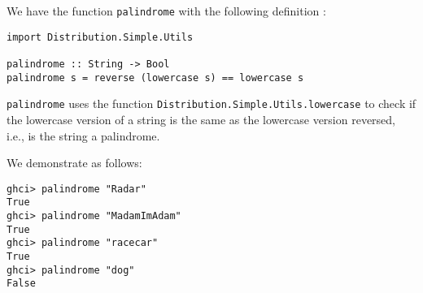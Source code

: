 
We have the function \verb|palindrome| with the following 
definition : 
\begin{verbatim}
import Distribution.Simple.Utils

palindrome :: String -> Bool
palindrome s = reverse (lowercase s) == lowercase s 
\end{verbatim}
\verb|palindrome| uses the function 
\verb|Distribution.Simple.Utils.lowercase| to check if the lowercase version 
of a string is the same as the lowercase version reversed, i.e., is the 
string a palindrome.\par
\qquad We demonstrate as follows:
\begin{verbatim}
ghci> palindrome "Radar"
True
ghci> palindrome "MadamImAdam"
True
ghci> palindrome "racecar"
True
ghci> palindrome "dog"
False
\end{verbatim}
